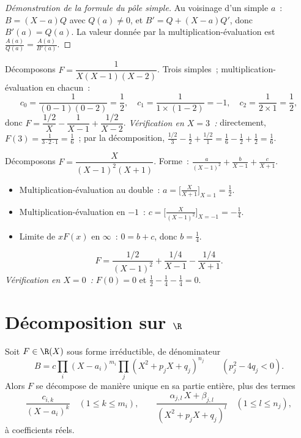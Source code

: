 \begin{proof}[Démonstration de la formule du pôle simple]
Au voisinage d'un  simple $a$~: $B = (X - a) Q$ avec $Q(a) \neq 0$,
et $B' = Q + (X - a) Q'$, donc $B'(a) = Q(a)$. La valeur donnée par la
multiplication-évaluation est $\frac{A(a)}{Q(a)} =
\frac{A(a)}{B'(a)}$.
\end{proof}

\begin{example}\label{ex:b1:fractions:simple}
Décomposons $F = \dfrac{1}{X(X-1)(X-2)}$. Trois  simples~;
multiplication-évaluation en chacun~:
\[
c_0 = \frac{1}{(0-1)(0-2)} = \frac12,
\quad
c_1 = \frac{1}{1 \times (1 - 2)} = -1,
\quad
c_2 = \frac{1}{2 \times 1} = \frac12,
\]
donc $F = \dfrac{1/2}{X} - \dfrac{1}{X-1} + \dfrac{1/2}{X-2}$.
\emph{Vérification en $X = 3$~:} directement, $F(3) =
\frac{1}{3\cdot2\cdot1} = \frac16$~; par la décomposition,
$\frac{1/2}{3} - \frac{1}{2} + \frac{1/2}{1} = \frac16 - \frac12 +
\frac12 = \frac16$.
\end{example}

\begin{example}\label{ex:b1:fractions:multiple}
Décomposons $F = \dfrac{X}{(X-1)^2 (X+1)}$. Forme~:
$\frac{a}{(X-1)^2} + \frac{b}{X-1} + \frac{c}{X+1}$.
\begin{itemize}
  \item Multiplication-évaluation au  double~: $a =
        \bigl[\frac{X}{X+1}\bigr]_{X=1} = \frac12$.
  \item Multiplication-évaluation en $-1$~: $c =
        \bigl[\frac{X}{(X-1)^2}\bigr]_{X=-1} = -\frac14$.
  \item Limite de $xF(x)$ en $\infty$~: $0 = b + c$, donc $b = \frac14$.
\end{itemize}
\[
F = \frac{1/2}{(X-1)^2} + \frac{1/4}{X-1} - \frac{1/4}{X+1} .
\]
\emph{Vérification en $X = 0$~:} $F(0) = 0$ et $\frac12 - \frac14 -
\frac14 = 0$.
\end{example}

\section{Décomposition sur $\R$}

\begin{theorem}\label{thm:b1:fractions:real}
Soit $F \in \R(X)$ sous forme irréductible, de dénominateur
\[
B = c \prod_i (X - a_i)^{m_i} \prod_j (X^2 + p_j X + q_j)^{n_j}
\qquad (p_j^2 - 4q_j < 0).
\]
Alors $F$ se décompose de manière unique en sa partie entière, plus des
termes
\[
\frac{c_{i,k}}{(X - a_i)^k} \quad (1 \leq k \leq m_i),
\qquad
\frac{\alpha_{j,l}\, X + \beta_{j,l}}{(X^2 + p_j X + q_j)^{l}}
\quad (1 \leq l \leq n_j),
\]
à coefficients réels.
\end{theorem}

